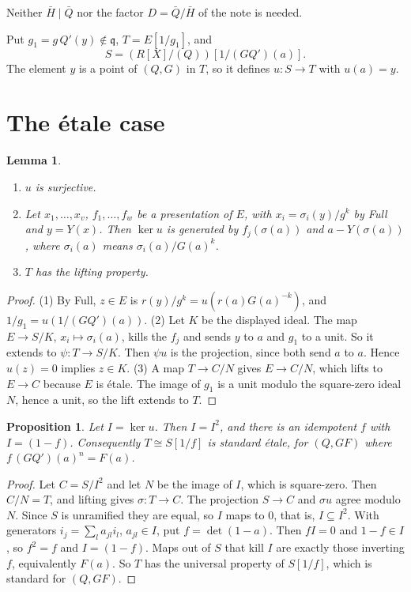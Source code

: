\documentclass[11pt]{amsart}
\numberwithin{equation}{section}
\newtheorem{proposition}[theorem]{Proposition}
\newtheorem{lemma}[theorem]{Lemma}
\theoremstyle{definition}
\theoremstyle{remark}
\newcommand{\q}{\mathfrak q}
\begin{document}
Neither $\bar H\mid\bar Q$ nor the factor $D=\bar Q/\bar H$ of the note
is needed.

Put $g_1=g\,Q'(y)\notin\q$, $T=E[1/g_1]$, and
\[
 S=(R[X]/(Q))[1/(GQ')(a)].
\]
The element $y$ is a point of $(Q,G)$ in $T$, so it defines
$u:S\to T$ with $u(a)=y$.

\section{The \'etale case}\label{sec:etale}

\begin{lemma}\label{lem:u}
\begin{enumerate}
\item $u$ is surjective.
\item Let $x_1,\ldots,x_v$, $f_1,\ldots,f_w$ be a presentation of $E$,
with $x_i=\sigma_i(y)/g^{k}$ by Full and $y=Y(x)$. Then $\ker u$ is
generated by $f_j(\sigma(a))$ and $a-Y(\sigma(a))$, where
$\sigma_i(a)$ means $\sigma_i(a)/G(a)^k$.
\item $T$ has the lifting property.
\end{enumerate}
\end{lemma}
\begin{proof}
(1) By Full, $z\in E$ is $r(y)/g^k=u(r(a)G(a)^{-k})$, and
$1/g_1=u(1/(GQ')(a))$. (2) Let $K$ be the displayed ideal. The map
$E\to S/K$, $x_i\mapsto\sigma_i(a)$, kills the $f_j$ and sends $y$ to
$a$ and $g_1$ to a unit. So it extends to $\psi:T\to S/K$. Then
$\psi u$ is the projection, since both send $a$ to $a$. Hence $u(z)=0$
implies $z\in K$. (3) A map $T\to C/N$ gives $E\to C/N$, which lifts
to $E\to C$ because $E$ is \'etale. The image of $g_1$ is a unit modulo
the square-zero ideal $N$, hence a unit, so the lift extends to $T$.
\end{proof}

\begin{proposition}\label{prop:etale}
Let $I=\ker u$. Then $I=I^2$, and there is an idempotent $f$ with
$I=(1-f)$. Consequently $T\cong S[1/f]$ is standard \'etale, for
$(Q,GF)$ where $f\,(GQ')(a)^n=F(a)$.
\end{proposition}
\begin{proof}
Let $C=S/I^2$ and let $N$ be the image of $I$, which is square-zero.
Then $C/N=T$, and lifting gives $\sigma:T\to C$. The projection
$S\to C$ and $\sigma u$ agree modulo $N$. Since $S$ is unramified they
are equal, so $I$ maps to $0$, that is, $I\subseteq I^2$. With
generators $i_j=\sum_la_{jl}i_l$, $a_{jl}\in I$, put $f=\det(1-a)$. Then
$fI=0$ and $1-f\in I$, so $f^2=f$ and $I=(1-f)$. Maps out of $S$ that
kill $I$ are exactly those inverting $f$, equivalently $F(a)$. So $T$
has the universal property of $S[1/f]$, which is standard for
$(Q,GF)$.
\end{proof}
\end{document}
